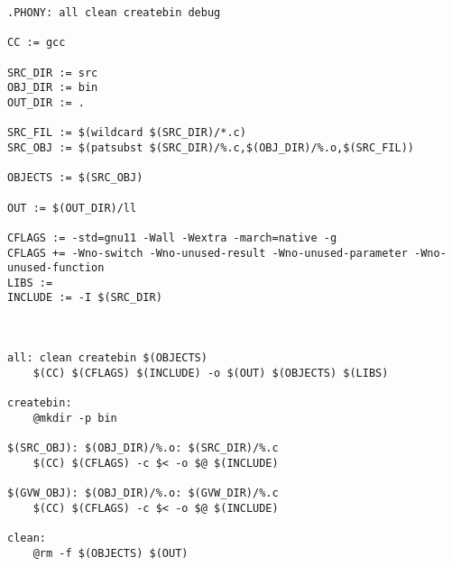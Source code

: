 \documentclass[subfiles]{main.tex}
\begin{document}
{\small 
\begin{verbatim}
.PHONY: all clean createbin debug

CC := gcc

SRC_DIR := src
OBJ_DIR := bin
OUT_DIR := .

SRC_FIL := $(wildcard $(SRC_DIR)/*.c)
SRC_OBJ := $(patsubst $(SRC_DIR)/%.c,$(OBJ_DIR)/%.o,$(SRC_FIL))

OBJECTS := $(SRC_OBJ)

OUT := $(OUT_DIR)/ll

CFLAGS := -std=gnu11 -Wall -Wextra -march=native -g
CFLAGS += -Wno-switch -Wno-unused-result -Wno-unused-parameter -Wno-unused-function
LIBS := 
INCLUDE := -I $(SRC_DIR)



all: clean createbin $(OBJECTS)
    $(CC) $(CFLAGS) $(INCLUDE) -o $(OUT) $(OBJECTS) $(LIBS)

createbin:
    @mkdir -p bin

$(SRC_OBJ): $(OBJ_DIR)/%.o: $(SRC_DIR)/%.c
    $(CC) $(CFLAGS) -c $< -o $@ $(INCLUDE)

$(GVW_OBJ): $(OBJ_DIR)/%.o: $(GVW_DIR)/%.c
    $(CC) $(CFLAGS) -c $< -o $@ $(INCLUDE)

clean:
    @rm -f $(OBJECTS) $(OUT)
\end{verbatim}
}
\end{document}
